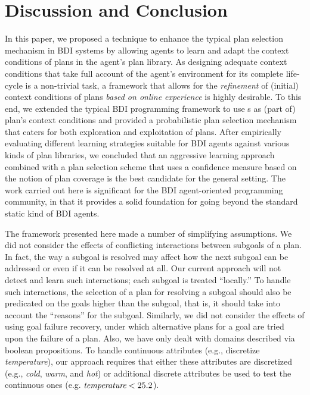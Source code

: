 \section{Discussion and Conclusion}\label{sec:discussion}

In this paper, we proposed a technique to enhance the typical plan selection
mechanism in BDI systems by allowing agents to learn and adapt the context
conditions of plans in the agent's plan library.
As designing adequate context conditions that take full account of the agent's
environment for its complete life-cycle is a non-trivial task, a framework that
allows for the \emph{refinement} of (initial) context conditions of plans
\textit{based on online experience} is highly desirable.
To this end, we extended the typical BDI programming framework to use \dt{}s as
(part of) plan's context conditions and provided a probabilistic plan selection
mechanism that caters for both exploration and exploitation of plans.
After empirically evaluating different learning strategies suitable for BDI
agents against various kinds of plan libraries, we concluded that an aggressive
learning approach combined with a plan selection scheme that uses a confidence
measure based on the notion of plan coverage is the best candidate for the
general setting.
The work carried out here is significant for the BDI agent-oriented programming
community, in that it provides a solid foundation for going beyond the standard
static kind of BDI agents.

The framework presented here made a number of simplifying assumptions.
We did not consider the effects of conflicting interactions between subgoals of
a plan. In fact, the way a subgoal is resolved may affect how the next subgoal
can be addressed or even if it can be resolved at all.
Our current approach will not detect and learn such interactions; each subgoal
is treated ``locally.'' To handle such interactions, the selection of a plan for 
resolving a subgoal should also be predicated on the goals higher than the
subgoal, that is, it should take into account the ``reasons'' for the subgoal.
Similarly, we did not consider the effects of using goal failure recovery, under
which alternative plans for a goal are tried upon the failure of a plan.
Also, we have only dealt with domains described via boolean propositions. To
handle continuous attributes (e.g., discretize \emph{temperature}), our approach
requires that either these attributes are discretized (e.g., \emph{cold}, \emph{warm},
and \emph{hot}) or additional discrete
attributes be used to test the continuous ones (e.g. $\emph{temperature} < 25.2$).


